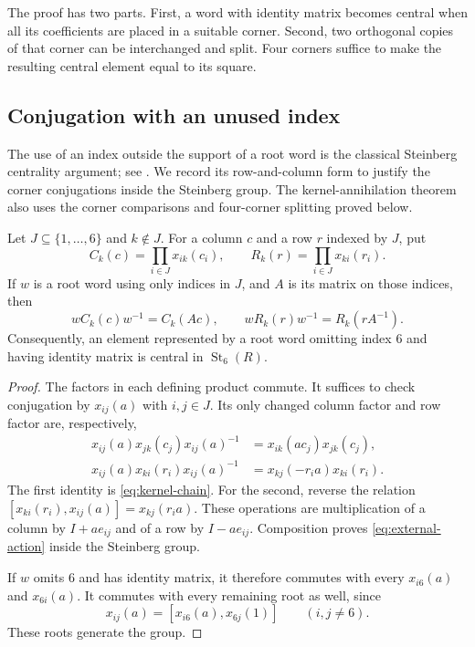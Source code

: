 The proof has two parts.  First, a word with identity matrix becomes
central when all its coefficients are placed in a suitable corner.
Second, two orthogonal copies of that corner can be interchanged and
split.  Four corners suffice to make the resulting central element
equal to its square.

\subsection{Conjugation with an unused index}

The use of an index outside the support of a root word is the classical
Steinberg centrality argument; see
\cite[proof of Theorem~III.5.2.1]{Weibel2013}.
We record its row-and-column form to justify the corner conjugations
inside the Steinberg group. The kernel-annihilation theorem also uses
the corner comparisons and four-corner splitting proved below.

\begin{lemma}\label{lem:external-roots}
Let $J\subseteq\{1,\ldots,6\}$ and $k\notin J$.  For a column $c$ and
a row $r$ indexed by $J$, put
\[
 C_k(c)=\prod_{i\in J}x_{ik}(c_i),\qquad
 R_k(r)=\prod_{i\in J}x_{ki}(r_i).
\]
If $w$ is a root word using only indices in $J$, and $A$ is its matrix
on those indices, then
\begin{equation}\label{eq:external-action}
 wC_k(c)w^{-1}=C_k(Ac),\qquad
 wR_k(r)w^{-1}=R_k(rA^{-1}).
\end{equation}
Consequently, an element represented by a root word omitting index $6$
and having identity matrix is central in $\operatorname{St}_6(R)$.
\end{lemma}

\begin{proof}
The factors in each defining product commute.  It suffices to check
conjugation by $x_{ij}(a)$ with $i,j\in J$.  Its only changed column
factor and row factor are, respectively,
\begin{align*}
 x_{ij}(a)x_{jk}(c_j)x_{ij}(a)^{-1}
    &=x_{ik}(ac_j)x_{jk}(c_j),\\
 x_{ij}(a)x_{ki}(r_i)x_{ij}(a)^{-1}
    &=x_{kj}(-r_i a)x_{ki}(r_i).
\end{align*}
The first identity is \eqref{eq:kernel-chain}.  For the second,
reverse the relation
$[x_{ki}(r_i),x_{ij}(a)]=x_{kj}(r_i a)$.
These operations are multiplication of a column by $I+ae_{ij}$ and
of a row by $I-ae_{ij}$.  Composition proves
\eqref{eq:external-action} inside the Steinberg group.

If $w$ omits $6$ and has identity matrix, it therefore commutes with
every $x_{i6}(a)$ and $x_{6i}(a)$.  It commutes with every remaining
root as well, since
\[
 x_{ij}(a)=[x_{i6}(a),x_{6j}(1)]\qquad(i,j\ne6).
\]
These roots generate the group.
\end{proof}

